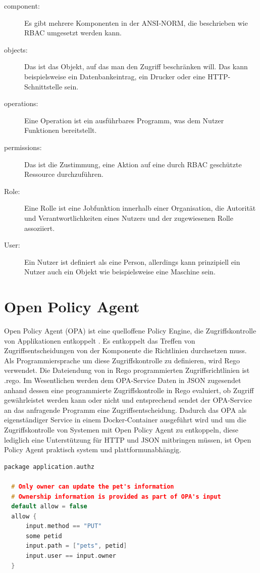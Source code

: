 \begin{description}
  \item[component:] Es gibt mehrere Komponenten in der ANSI-NORM, die beschrieben wie \ac{RBAC}
  umgesetzt werden kann.
  \item[objects:] Das ist das Objekt, auf das man den Zugriff beschränken will. Das kann
  beispielsweise ein Datenbankeintrag, ein Drucker oder eine HTTP-Schnittstelle sein.
  \item[operations:] Eine Operation ist ein ausführbares Programm, was dem Nutzer Funktionen
  bereitstellt.
  \item[permissions:] Das ist die Zustimmung, eine Aktion auf eine durch \ac{RBAC} geschützte 
  Ressource durchzuführen.
  \item[Role:] Eine Rolle ist eine Jobfunktion innerhalb einer Organisation, die Autorität und 
  Verantwortlichkeiten eines Nutzers und der zugewiesenen Rolle assoziiert.
  \item[User:] Ein Nutzer ist definiert als eine Person, allerdings kann prinzipiell ein Nutzer auch ein 
  Objekt wie beispielsweise eine Maschine sein.
\end{description}

\section{Open Policy Agent}
\label{sec:OpenPolicyAgent}
Open Policy Agent (OPA) ist eine quelloffene Policy Engine, die Zugriffskontrolle von 
Applikationen entkoppelt \citep{opaperformance:2021:07}. Es entkoppelt das Treffen von Zugriffsentscheidungen von der Komponente die Richtlinien durchsetzen muss.
Als Programmiersprache um diese Zugriffskontrolle zu definieren, wird Rego verwendet. 
Die Dateiendung von in Rego programmierten Zugriffsrichtlinien ist .rego. 
Im Wesentlichen werden dem OPA-Service Daten in JSON zugesendet anhand dessen eine 
programmierte Zugriffskontrolle in Rego evaluiert, ob Zugriff gewährleistet werden kann 
oder nicht und entsprechend sendet der OPA-Service an das anfragende Programm eine 
Zugriffsentscheidung. Dadurch das OPA als eigenständiger Service in einem Docker-Container ausgeführt wird und um die Zugriffskontrolle von Systemen mit Open Policy 
Agent zu entkoppeln, diese lediglich eine Unterstützung für HTTP und JSON mitbringen 
müssen, ist Open Policy Agent praktisch system und plattformunabhängig.

\begin{lstlisting}[language=C++,frame=tb,caption={Zugriffsrichtlinie in Rego},label=lst:ZugriffsrichtlinieinRego]
  package application.authz

  # Only owner can update the pet's information
  # Ownership information is provided as part of OPA's input
  default allow = false
  allow {
      input.method == "PUT"
      some petid
      input.path = ["pets", petid]
      input.user == input.owner
  }
\end{lstlisting}

